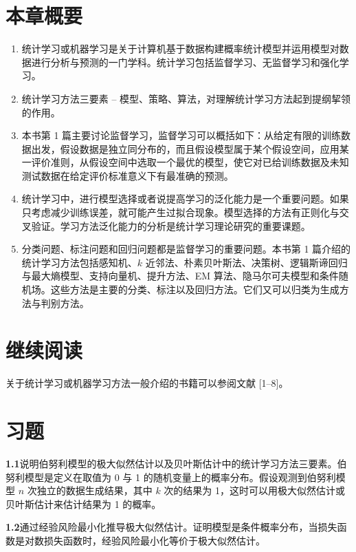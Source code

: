 \documentclass[UTF8, 12pt, fontset=fandol, oneside]{ctexart}
\begin{document}
\section*{本章概要}

\begin{enumerate}
  \item 统计学习或机器学习是关于计算机基于数据构建概率统计模型并运用模型对数据进行分析与预测的一门学科。统计学习包括监督学习、无监督学习和强化学习。
  \item 统计学习方法三要素 -- 模型、策略、算法，对理解统计学习方法起到提纲挈领的作用。
  \item 本书第 1 篇主要讨论监督学习，监督学习可以概括如下：从给定有限的训练数据出发，假设数据是独立同分布的，而且假设模型属于某个假设空间，应用某一评价准则，从假设空间中选取一个最优的模型，使它对已给训练数据及未知测试数据在给定评价标准意义下有最准确的预测。
  \item 统计学习中，进行模型选择或者说提高学习的泛化能力是一个重要问题。如果只考虑减少训练误差，就可能产生过拟合现象。模型选择的方法有正则化与交叉验证。学习方法泛化能力的分析是统计学习理论研究的重要课题。
  \item 分类问题、标注问题和回归问题都是监督学习的重要问题。本书第 1 篇介绍的统计学习方法包括感知机、$k$ 近邻法、朴素贝叶斯法、决策树、逻辑斯谛回归与最大熵模型、支持向量机、提升方法、EM 算法、隐马尔可夫模型和条件随机场。这些方法是主要的分类、标注以及回归方法。它们又可以归类为生成方法与判别方法。
\end{enumerate}

\section*{继续阅读}

关于统计学习或机器学习方法一般介绍的书籍可以参阅文献 [1--8]。

\section*{习题}

\noindent\textbf{1.1}\quad 说明伯努利模型的极大似然估计以及贝叶斯估计中的统计学习方法三要素。伯努利模型是定义在取值为 0 与 1 的随机变量上的概率分布。假设观测到伯努利模型 $n$ 次独立的数据生成结果，其中 $k$ 次的结果为 1，这时可以用极大似然估计或贝叶斯估计来估计结果为 1 的概率。

\noindent\textbf{1.2}\quad 通过经验风险最小化推导极大似然估计。证明模型是条件概率分布，当损失函数是对数损失函数时，经验风险最小化等价于极大似然估计。
\end{document}
